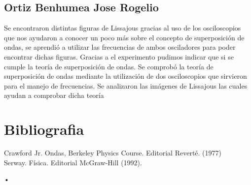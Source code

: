 \documentclass[11pt]{article}
\begin{document}
\begin{multicols}{2}
	\subsection{Ortiz Benhumea Jose Rogelio}
	Se encontraron distintas figuras de Lissajous gracias al uso de los osciloscopios que nos ayudaron a conocer un poco más sobre el concepto de superposición de ondas, se aprendió a utilizar las frecuencias de ambos osciladores para poder encontrar dichas figuras. Gracias a el experimento pudimos indicar que si se cumple la teoría de superposición de ondas. Se comprobó la teoría de superposición de ondas mediante la utilización de dos osciloscopios que sirvieron para el manejo de frecuencias. Se analizaron las imágenes de Lissajous las cuales ayudan a comprobar dicha teoría

\section{Bibliografia}
Crawford Jr. Ondas, Berkeley Physics Course. Editorial Reverté. (1977)\\
Serway. Física. Editorial McGraw-Hill (1992).

\end{multicols}

	\begin{flushright}
	•
	\end{flushright}
\end{document}
